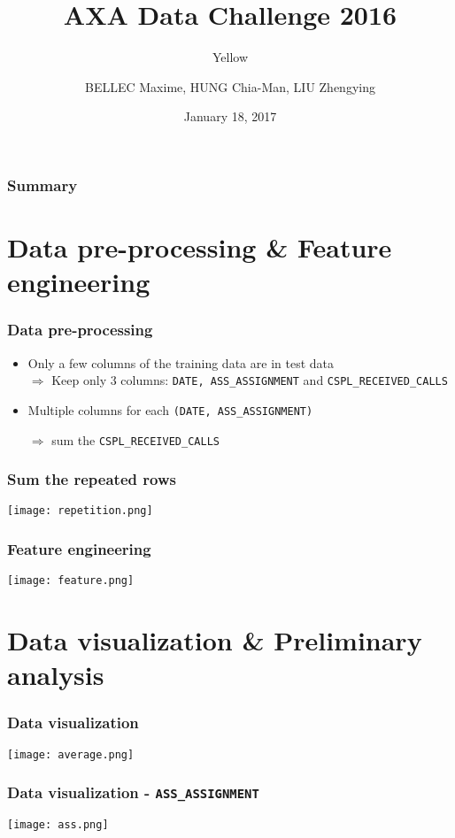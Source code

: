 \documentclass{beamer}
\title{AXA Data Challenge 2016}
\subtitle{Yellow}
\author{BELLEC Maxime, HUNG Chia-Man, LIU Zhengying}
\institute{Master Data Science}
\date{January 18, 2017}
\begin{document}
\frame{\titlepage}

\begin{frame} \frametitle{Summary}
\tableofcontents
\end{frame}


\section{Data pre-processing \& Feature engineering}

\begin{frame}
\frametitle{Data pre-processing}
\begin{itemize}
\item
Only a few columns of the training data are in test data \\

$\Rightarrow$ Keep only 3 columns:  \texttt{DATE, ASS\_ASSIGNMENT} and  \texttt{CSPL\_RECEIVED\_CALLS}

\item
Multiple columns for each \texttt{(DATE, ASS\_ASSIGNMENT)}

$\Rightarrow$ sum the \texttt{CSPL\_RECEIVED\_CALLS}
\end{itemize}
\end{frame}

\begin{frame}\frametitle{Sum the repeated rows}
\centering
\texttt{[image: repetition.png]}

\end{frame}

\begin{frame}
\frametitle{Feature engineering}
\centering
\texttt{[image: feature.png]}
\end{frame}



\section{Data visualization \& Preliminary analysis}

\begin{frame}\frametitle{Data visualization}
\centering
\texttt{[image: average.png]}
\end{frame}

\begin{frame}\frametitle{Data visualization - \texttt{ASS\_ASSIGNMENT}}
\centering
\texttt{[image: ass.png]}
\end{frame}
\end{document}

